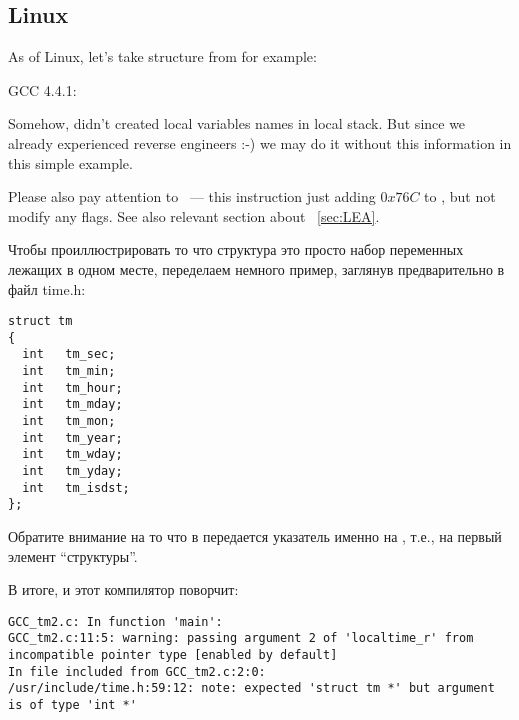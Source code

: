 \subsection{Linux}

{As of Linux, let's take  structure from  for example:}



 GCC 4.4.1:

\IFRU{}{}

{Somehow, \IDA didn't created local variables names in local stack.
But since we already experienced reverse engineers :-) we may do it without this information in 
this simple example.}

{Please also pay attention to  ~--- this instruction just adding $0x76C$ to \EAX,
but not modify any flags. See also relevant section about \LEA{}~\ref{sec:LEA}.}

Чтобы проиллюстрировать то что структура это просто набор переменных лежащих в одном месте, переделаем немного
пример, заглянув предварительно в файл time.h:

\begin{lstlisting}[caption=time.h]
struct tm
{
  int	tm_sec;
  int	tm_min;
  int	tm_hour;
  int	tm_mday;
  int	tm_mon;
  int	tm_year;
  int	tm_wday;
  int	tm_yday;
  int	tm_isdst;
};
\end{lstlisting}



Обратите внимание на то что в  передается указатель именно на , 
т.е., на первый элемент ``структуры''.

В итоге, и этот компилятор поворчит:

\begin{lstlisting}[caption=GCC 4.7.3]
GCC_tm2.c: In function 'main':
GCC_tm2.c:11:5: warning: passing argument 2 of 'localtime_r' from incompatible pointer type [enabled by default]
In file included from GCC_tm2.c:2:0:
/usr/include/time.h:59:12: note: expected 'struct tm *' but argument is of type 'int *'
\end{lstlisting}

